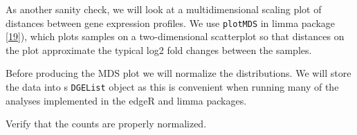 \documentclass[
]{book}
\newenvironment{Shaded}{\begin{snugshade}}{\end{snugshade}}
\newcommand{\CommentTok}[1]{\textcolor[rgb]{0.56,0.35,0.01}{\textit{#1}}}
\newcommand{\DataTypeTok}[1]{\textcolor[rgb]{0.13,0.29,0.53}{#1}}
\newcommand{\KeywordTok}[1]{\textcolor[rgb]{0.13,0.29,0.53}{\textbf{#1}}}
\newcommand{\NormalTok}[1]{#1}
\newcommand{\OperatorTok}[1]{\textcolor[rgb]{0.81,0.36,0.00}{\textbf{#1}}}
\newcommand{\StringTok}[1]{\textcolor[rgb]{0.31,0.60,0.02}{#1}}
\begin{document}
As another sanity check, we will look at a
multidimensional scaling plot of distances between gene expression
profiles. We use \texttt{plotMDS} in limma package {[}\protect\hyperlink{ref-Ritchie:2015aa}{19}{]}),
which plots samples on a two-dimensional scatterplot so that distances on
the plot approximate the typical log2 fold changes between the
samples.

Before producing the MDS plot we will normalize the distributions.
We will store the data into s \texttt{DGEList} object as this is convenient
when running many of the analyses implemented in the edgeR and limma packages.

\begin{Shaded}
\end{Shaded}

Verify that the counts are properly normalized.
\end{document}
